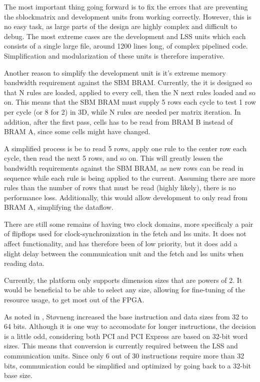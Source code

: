 The most important thing going forward is to fix the errors that are preventing the sblockmatrix and development units from working correctly.
However, this is no easy task, as large parts of the design are highly complex and difficult to debug.
The most extreme cases are the development and LSS units which each consists of a single large file, around 1200 lines long, of complex pipelined code.
Simplification and modularization of these units is therefore imperative.

Another reason to simplify the development unit is it's extreme memory bandwidth requirement against the SBM BRAM.
Currently, the it is designed so that N rules are loaded, applied to every cell, then the N next rules loaded and so on.
This means that the SBM BRAM must supply 5 rows each cycle to test 1 row per cycle (or 8 for 2) in 3D, while N rules are needed per matrix iteration.
In addition, after the first pass, cells has to be read from BRAM B instead of BRAM A, since some cells might have changed.

A simplified process is be to read 5 rows, apply one rule to the center row each cycle, then read the next 5 rows, and so on.
This will greatly lessen the bandwidth requirements against the SBM BRAM, as new rows can be read in sequence while each rule is being applied to the current.
Assuming there are more rules than the number of rows that must be read (highly likely), there is no performance loss.
Additionally, this would allow development to only read from BRAM A, simplifying the dataflow.

There are still some remains of having two clock domains, more specificaly a pair of flipflops used for clock-synchronization in the fetch and lss units.
It does not affect functionality, and has therefore been of low priority, but it does add a slight delay between the communication unit and the fetch and lss units when reading data.

Currently, the platform only supports dimension sizes that are powers of 2.
It would be beneficial to be able to select any size, allowing for fine-tuning of the resource usage, to get most out of the FPGA.

As noted in \cite{stovneng2014sblock}, Støvneng increased the base instruction and data sizes from 32 to 64 bits.
Although it is one way to accomodate for longer instructions, the decision is a little odd, considering both PCI and PCI Express are based on 32-bit word sizes.
This means that conversion is currently required between the LSS and communication units.
Since only 6 out of 30 instructions require more than 32 bits, communication could be simplified and optimized by going back to a 32-bit base size.

